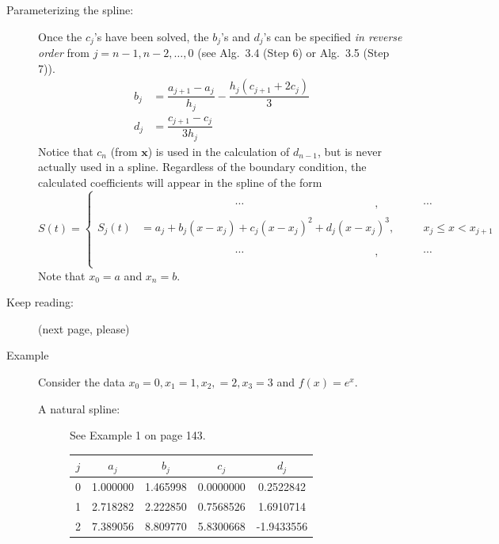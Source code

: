 \documentclass[12pt]{article}
\begin{document}
\begin{description}
\item[Parameterizing the spline:] Once the \(c_j\)'s have been solved, the \(b_j\)'s and \(d_j\)'s can be specified \textit{in reverse order} from \(j=n-1,n-2,\dots,0\) (see Alg.~3.4 (Step 6) or Alg.~3.5 (Step 7)).
\begin{align*}
b_j & = \dfrac{a_{j+1} - a_j}{h_j} - \dfrac{h_j(c_{j+1} + 2c_j)}{3}\\
d_j & = \dfrac{c_{j+1} - c_j}{3h_j}
\end{align*}
Notice that \(c_n\) (from \(\mathbf{x}\)) is used in the calculation of \(d_{n-1}\), but is never actually used in a spline. Regardless of the boundary condition, the calculated coefficients will appear in the spline of the form
%
\begin{equation*}
S(t) = \left\{\begin{alignedat}{2}
&\phantom{a_j + b_j(x-x_j) + } \cdots \phantom{(x-x_j)^2  + d_j(x-x_j)^3}, &&\cdots\\
S_j(t) &= a_j + b_j(x-x_j) + c_j(x-x_j)^2  + d_j(x-x_j)^3,  \quad &&x_j\leq x < x_{j+1}\\
&\phantom{a_j + b_j(x-x_j) + } \cdots \phantom{(x-x_j)^2  + d_j(x-x_j)^3}, &&\cdots\\
\end{alignedat}\right.
\end{equation*}
%
Note that \(x_0=a\) and \(x_n=b\).
\item[Keep reading:] (next page, please)
\newpage

\item[Example] Consider the data \(x_0 = 0, x_1=1, x_2, =2, x_3=3\) and \(f(x) = e^x\).  

\begin{description}
\item[A natural spline:] See Example 1 on page 143.
\begin{center}
\begin{tabular}{c|cccc}
\(j\) & \(a_j\) & \(b_j\) & \(c_j\) & \(d_j\)\\
\hline
\hline
0 & 1.000000 & 1.465998 & 0.0000000 & 0.2522842\\
1 & 2.718282 & 2.222850 & 0.7568526 & 1.6910714\\
2 & 7.389056 & 8.809770 & 5.8300668 & -1.9433556
\end{tabular}


\end{center}
\end{description}
\end{description}
\end{document}
